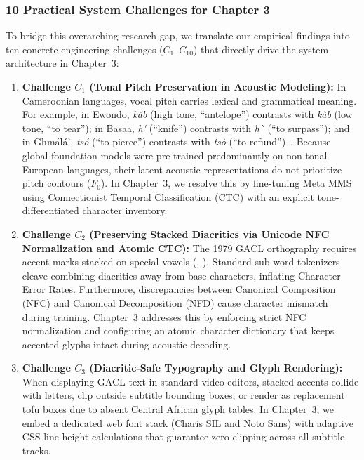 \documentclass[a4paper,11pt]{article}
\begin{document}
\subsubsection{10 Practical System Challenges for Chapter 3}
\label{sec:chap2_challenges}

To bridge this overarching research gap, we translate our empirical findings into ten concrete engineering challenges ($C_1$--$C_{10}$) that directly drive the system architecture in Chapter~3:

\begin{enumerate}
    \item \textbf{Challenge $C_1$ (Tonal Pitch Preservation in Acoustic Modeling):} In Cameroonian languages, vocal pitch carries lexical and grammatical meaning. For example, in Ewondo, \textit{k\'ab} (high tone, ``antelope'') contrasts with \textit{k\`ab} (low tone, ``to tear''); in Basaa, \textit{h\'\textepsilon} (``knife'') contrasts with \textit{h\`\textepsilon} (``to surpass''); and in Gh\textopeno m\'al\'a', \textit{ts\'o} (``to pierce'') contrasts with \textit{ts\`o} (``to refund'')~\cite{essono2000ewondo, lemb1973dictionnaire, sadembouo1984systematique}. Because global foundation models were pre-trained predominantly on non-tonal European languages, their latent acoustic representations do not prioritize pitch contours ($F_0$). In Chapter~3, we resolve this by fine-tuning Meta MMS using Connectionist Temporal Classification (CTC) with an explicit tone-differentiated character inventory.

    \item \textbf{Challenge $C_2$ (Preserving Stacked Diacritics via Unicode NFC Normalization and Atomic CTC):} The 1979 GACL orthography requires accent marks stacked on special vowels (\textopeno, \textschwa). Standard sub-word tokenizers cleave combining diacritics away from base characters, inflating Character Error Rates. Furthermore, discrepancies between Canonical Composition (NFC) and Canonical Decomposition (NFD) cause character mismatch during training. Chapter~3 addresses this by enforcing strict NFC normalization and configuring an atomic character dictionary that keeps accented glyphs intact during acoustic decoding.

    \item \textbf{Challenge $C_3$ (Diacritic-Safe Typography and Glyph Rendering):} When displaying GACL text in standard video editors, stacked accents collide with letters, clip outside subtitle bounding boxes, or render as replacement tofu boxes due to absent Central African glyph tables. In Chapter~3, we embed a dedicated web font stack (Charis SIL and Noto Sans) with adaptive CSS line-height calculations that guarantee zero clipping across all subtitle tracks.


\end{enumerate}
\end{document}

